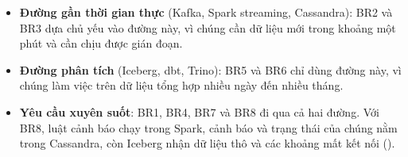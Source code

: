 \begin{itemize}
  \item \textbf{Đường gần thời gian thực} (Kafka, Spark streaming, Cassandra): BR2 và BR3 dựa chủ yếu vào đường này, vì chúng cần dữ liệu mới trong khoảng một phút và cần chịu được gián đoạn.
  \item \textbf{Đường phân tích} (Iceberg, dbt, Trino): BR5 và BR6 chỉ dùng đường này, vì chúng làm việc trên dữ liệu tổng hợp nhiều ngày đến nhiều tháng.
  \item \textbf{Yêu cầu xuyên suốt}: BR1, BR4, BR7 và BR8 đi qua cả hai đường. Với BR8, luật cảnh báo chạy trong Spark, cảnh báo và trạng thái của chúng nằm trong Cassandra, còn Iceberg nhận dữ liệu thô và các khoảng mất kết nối ().
\end{itemize}
